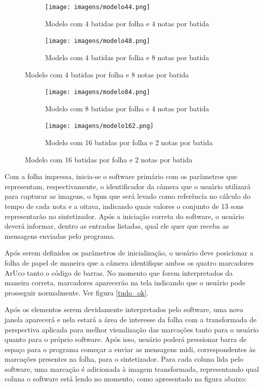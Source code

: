 \documentclass[12pt]{report}
\begin{document}
\begin{figure}[H]
  \centering
  \begin{subfigure}{0.4\textwidth}
    \centering
    \texttt{[image: imagens/modelo44.png]}
    \caption{Modelo com 4 batidas por folha e 4 notas por batida}
    \label{fig:modelo44}
  \end{subfigure}
  \begin{subfigure}{0.4\textwidth}
    \centering
    \texttt{[image: imagens/modelo48.png]}
    \caption{Modelo com 4 batidas por folha e 8 notas por batida}
    \label{fig:modelo48}
  \end{subfigure}
\end{figure}

\begin{figure}[H]
  \centering
  \begin{subfigure}{0.4\textwidth}
    \centering
    \texttt{[image: imagens/modelo84.png]}
    \caption{Modelo com 8 batidas por folha e 4 notas por batida}
    \label{fig:modelo84}
  \end{subfigure}
  \begin{subfigure}{0.4\textwidth}
    \centering
    \texttt{[image: imagens/modelo162.png]}
    \caption{Modelo com 16 batidas por folha e 2 notas por batida}
    \label{fig:modelo162}
  \end{subfigure}
\end{figure}

Com a folha impressa, inicia-se o software primário com os parâmetros que representam, respectivamente, o identificador da câmera que o usuário utilizará para capturar as imagens, o bpm que será levado como referência no cálculo do tempo de cada nota e a oitava, indicando quais valores o conjunto de 13 sons representarão no sintetizador. Após a iniciação correta do software, o usuário deverá informar, dentro as entradas listadas, qual ele quer que receba as mensagens enviadas pelo programa.

Após serem definidos os parâmetros de inicialização, o usuário deve posicionar a folha de papel de maneira que a câmera identifique ambos os quatro marcadores ArUco tanto o código de barras. No momento que forem interpretados da maneira correta, marcadores aparecerão na tela indicando que o usuário pode prosseguir normalmente. Ver figura \ref{tudo_ok}.

Após os elementos serem devidamente interpretados pelo software, uma nova janela aparecerá e nela estará a área de interesse da folha com a transformada de perspectiva aplicada para melhor visualização das marcações tanto para o usuário quanto para o próprio software. Após isso, usuário poderá pressionar barra de espaço para o programa começar a enviar as mensagens midi, correspondentes às marcações presentes na folha, para o sintetizador. Para cada coluna lida pelo software, uma marcação é adicionada à imagem transformada, representando qual coluna o software está lendo no momento, como apresentado na figura abaixo:
\end{document}
